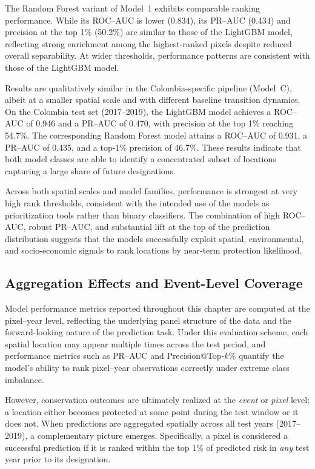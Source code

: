 \documentclass[12pt]{article}
\theoremstyle{break} %
\begin{document}
The Random Forest variant of Model~1 exhibits comparable ranking performance. While its ROC--AUC is lower (0.834), its PR--AUC (0.434) and precision at the top 1\% (50.2\%) are similar to those of the LightGBM model, reflecting strong enrichment among the highest-ranked pixels despite reduced overall separability. At wider thresholds, performance patterns are consistent with those of the LightGBM model.

Results are qualitatively similar in the Colombia-specific pipeline (Model~C), albeit at a smaller spatial scale and with different baseline transition dynamics. On the Colombia test set (2017--2019), the LightGBM model achieves a ROC--AUC of 0.946 and a PR--AUC of 0.470, with precision at the top 1\% reaching 54.7\%. The corresponding Random Forest model attains a ROC--AUC of 0.931, a PR--AUC of 0.435, and a top-1\% precision of 46.7\%. These results indicate that both model classes are able to identify a concentrated subset of locations capturing a large share of future designations.

Across both spatial scales and model families, performance is strongest at very high rank thresholds, consistent with the intended use of the models as prioritization tools rather than binary classifiers. The combination of high ROC--AUC, robust PR--AUC, and substantial lift at the top of the prediction distribution suggests that the models successfully exploit spatial, environmental, and socio-economic signals to rank locations by near-term protection likelihood.

\subsection{Aggregation Effects and Event-Level Coverage}
\label{results:aggregation}

Model performance metrics reported throughout this chapter are computed at the pixel--year level, reflecting the underlying panel structure of the data and the forward-looking nature of the prediction task. Under this evaluation scheme, each spatial location may appear multiple times across the test period, and performance metrics such as PR--AUC and Precision@Top-$k$\% quantify the model’s ability to rank pixel--year observations correctly under extreme class imbalance.

However, conservation outcomes are ultimately realized at the \emph{event} or \emph{pixel} level: a location either becomes protected at some point during the test window or it does not. When predictions are aggregated spatially across all test years (2017--2019), a complementary picture emerges. Specifically, a pixel is considered a successful prediction if it is ranked within the top 1\% of predicted risk in \emph{any} test year prior to its designation.
\end{document}
